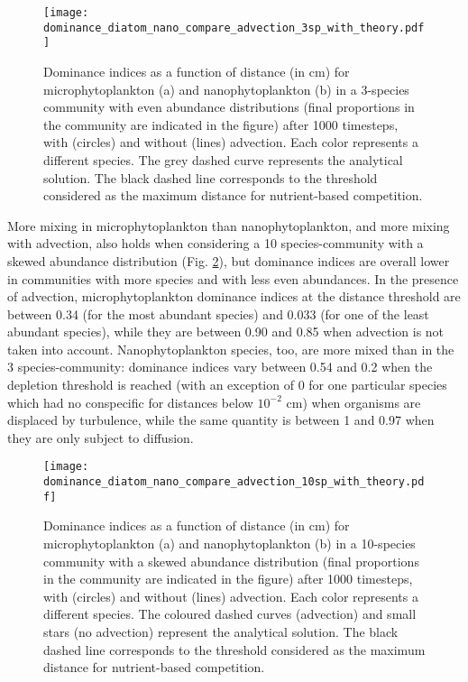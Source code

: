 \documentclass[12pt,english]{article}
\begin{document}
\begin{figure}[H]
\begin{centering}
\texttt{[image: dominance\_diatom\_nano\_compare\_advection\_3sp\_with\_theory.pdf]} 
\par\end{centering}
\caption{Dominance indices as a function of distance (in cm) for microphytoplankton
(a) and nanophytoplankton (b) in a 3-species community with even abundance
distributions (final proportions in the community are indicated in
the figure) after 1000 timesteps, with (circles) and without (lines)
advection. Each color represents a different species. The grey dashed curve represents the analytical solution. The black dashed line corresponds to the threshold considered as the maximum distance for nutrient-based competition.\label{fig:Dominance-3sp}}
\end{figure}

More mixing in microphytoplankton than nanophytoplankton, and more
mixing with advection, also holds when considering a 10 species-community
with a skewed abundance distribution (Fig. \ref{fig:Dominance-10sp}),
but dominance indices are overall lower in communities with more species
and with less even abundances. In the presence of advection, microphytoplankton
dominance indices at the distance threshold are between 0.34 (for
the most abundant species) and 0.033 (for one of the least abundant
species), while they are between 0.90 and 0.85 when advection is not
taken into account. Nanophytoplankton species, too, are more mixed
than in the 3 species-community: dominance indices vary between 0.54
and 0.2 when the depletion threshold is reached (with an exception
of 0 for one particular species which had no conspecific for distances
below $10^{-2}$ cm) when organisms are displaced by turbulence, while
the same quantity is between 1 and 0.97 when they are only subject
to diffusion.

\begin{figure}[H]
\begin{centering}
\texttt{[image: dominance\_diatom\_nano\_compare\_advection\_10sp\_with\_theory.pdf]} 
\par\end{centering}
\caption{Dominance indices as a function of distance (in cm) for microphytoplankton
(a) and nanophytoplankton (b) in a 10-species community with a skewed
abundance distribution (final proportions in the community are indicated
in the figure) after 1000 timesteps, with (circles) and without (lines)
advection. Each color represents a different species. The coloured dashed curves (advection) and small stars (no advection) represent the analytical solution. The black dashed line corresponds to the threshold considered as the maximum distance for nutrient-based competition.\label{fig:Dominance-10sp}}
\end{figure}
\end{document}
